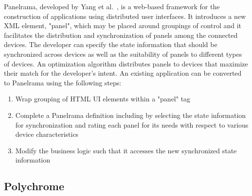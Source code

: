 Panelrama, developed by Yang et al.~\cite{panelrama2014}, is a web-based framework for the construction of applications using distributed user interfaces. It introduces a new XML element, "panel", which may be placed around groupings of control and it facilitates the distribution and synchronization of panels among the connected devices. The developer can specify the state information that should be synchronized across devices as well as the suitability of panels to different types of devices. An optimization algorithm distributes panels to devices that maximize their match for the developer's intent. An existing application can be converted to Panelrama using the following steps:
\begin{enumerate}
	\item Wrap grouping of HTML UI elements within a "panel" tag
	\item Complete a Panelrama definition including by selecting the state information for synchronization and rating each panel for its needs with respect to various device characteristics
	\item Modify the business logic such that it accesses the new synchronized state information
\end{enumerate}

\subsection{Polychrome}

